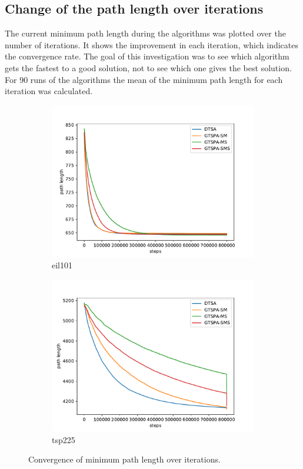 \documentclass[12pt]{article}
\theoremstyle{plain}
\theoremstyle{definition}
\theoremstyle{remark}
\begin{document}
\subsection{Change of the path length over iterations}
\label{sec:Change_of_path_length_over_time}

The current minimum path length during the algorithms was plotted over the number of iterations.
It shows the improvement in each iteration, which indicates the convergence rate.
The goal of this investigation was to see which algorithm gets the fastest to a good solution, not to see which one gives the best solution.
For 90 runs of the algorithms the mean of the minimum path length for each iteration was calculated.

\begin{figure}[h]
	\centering
	\begin{subfigure}{.5\textwidth}
		\centering
		\includegraphics[width=\textwidth]{../../Implementation/gen/mean_convergence_eil101}
		\caption {eil101}
	\end{subfigure}%
	\begin{subfigure}{.5\textwidth}
		\centering
		\includegraphics[width=\textwidth]{../../Implementation/gen/mean_convergence_tsp225}
		\caption {tsp225}
	\end{subfigure}
	\caption{Convergence of minimum path length over iterations.}
	\label{fig:mean_convergence_text}
\end{figure}
\end{document}
